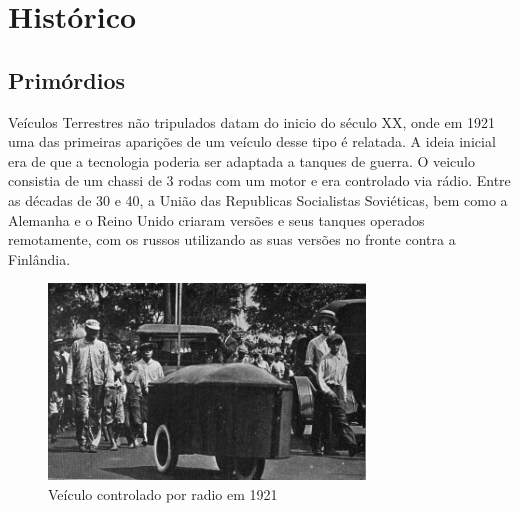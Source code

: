 \chapter{Histórico}
\label{cap:historico}
\section{Primórdios}
Veículos Terrestres não tripulados datam do inicio do século XX, onde em 1921 uma das primeiras aparições de um veículo desse tipo é relatada. A ideia inicial era de que a tecnologia poderia ser adaptada a tanques de guerra. O veiculo consistia de um chassi de 3 rodas com um motor e era controlado via rádio. Entre as décadas de 30 e 40, a União das Republicas Socialistas Soviéticas, bem como a Alemanha e o Reino Unido criaram versões e seus tanques operados remotamente, com os russos utilizando as suas versões no fronte contra a Finlândia.
\begin{figure}[!htb]
    \centering
    \includegraphics[width=0.75\textwidth]{figuras/controaldo_1921.jpg}
    \caption{Veículo controlado por radio em 1921}
    \label{fig:veiculo:1921}
\end{figure}

